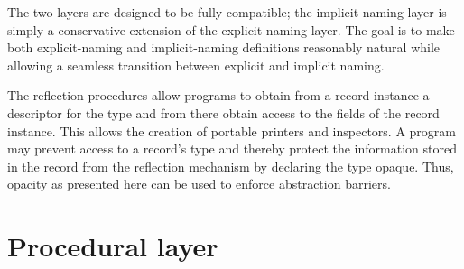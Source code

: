The two layers are designed to be fully compatible; the implicit-naming layer
is simply a conservative extension of the explicit-naming layer. The goal is to
make both explicit-naming and implicit-naming definitions reasonably natural
while allowing a seamless transition between explicit and implicit naming.

The reflection procedures allow programs to obtain from a record instance a
descriptor for the type and from there obtain access to the fields of the
record instance. This allows the creation of portable printers and inspectors.
A program may prevent access to a record's type and thereby protect the
information stored in the record from the reflection mechanism by declaring the
type opaque. Thus, opacity as presented here can be used to enforce abstraction
barriers.

\section{Procedural layer}

